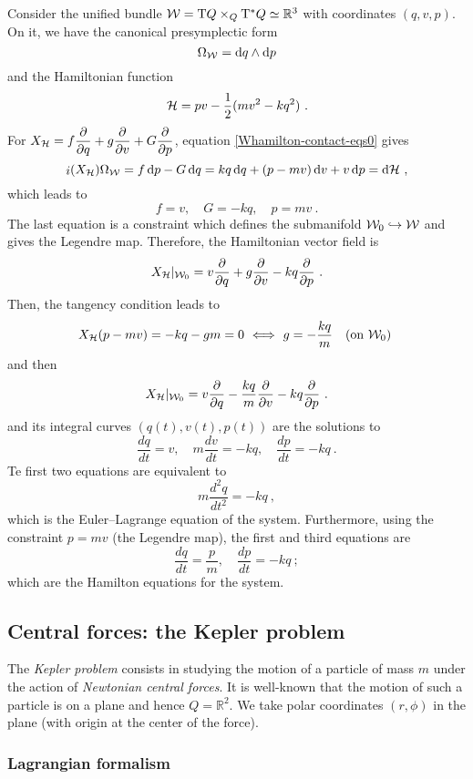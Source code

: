 \documentclass[12pt]{report}
\def\derpar#1#2{\frac{\partial{#1}}{\partial{#2}}}
\def\d{{\rm d}}
\def\Real{\mathbb{R}}
\def\Tan{{\rm T}}
\def\inn{\mathop{i}\nolimits}
\begin{document}
Consider the unified bundle ${\cal W}=\Tan Q\times_Q\Tan^*Q\simeq\Real^3$
with coordinates $(q,v,p)$. On it, we have the canonical presymplectic form
$$
\Omega_{\cal W}=\d q\wedge\d p 
$$
and the Hamiltonian function
$$
{\cal H}=pv-\frac{1}{2}(mv^2-kq^2) \ .
$$
For $\displaystyle X_{\cal H}=f\derpar{}{q}+g\derpar{}{v}+G\derpar{}{p}$,
equation \eqref{Whamilton-contact-eqs0} gives
$$
\inn(X_{\cal H})\Omega_{\cal W}= f\, \d p-G\, \d q=
kq\, \d q+(p-mv)\,\d v+v\, \d p=\d{\cal H}\ ,
$$
which leads to
$$
f=v ,\quad G=-kq ,\quad p=mv  \ .
$$
The last equation is a constraint which defines the submanifold
${\cal W}_0\hookrightarrow{\cal W}$ and gives the Legendre map.
Therefore, the Hamiltonian vector field is
$$
X_{\cal H}\vert_{{\cal W}_0}=v\derpar{}{q}+g\derpar{}{v}-kq\derpar{}{p} \ .
$$
Then, the tangency condition leads to
$$
X_{\cal H}(p-mv)=-kq-gm=0 \ \Longleftrightarrow\
g=-\frac{kq}{m} \quad \mbox{\rm (on ${\cal W}_0$)} \ 
$$
and then
$$
X_{\cal H}\vert_{{\cal W}_0}=v\derpar{}{q}-\frac{kq}{m}\derpar{}{v}-kq\derpar{}{p} \ .
$$
and its integral curves $(q(t),v(t),p(t))$ are the solutions to
$$
\frac{dq}{dt}=v ,\quad
m\frac{dv}{dt}=-kq ,\quad
\frac{dp}{dt}=-kq \ .
$$
Te first two equations are equivalent to
$$
m\frac{d^2q}{dt^2}=-kq \ ,
$$
which is the Euler--Lagrange equation of the system. 
Furthermore, using the constraint $p=mv$ (the Legendre map),
the first and third equations are
$$
\frac{dq}{dt}=\frac{p}{m} ,\quad
\frac{dp}{dt}=-kq \ ;
$$
which are the Hamilton equations for the system.


\subsection{Central forces: the Kepler problem}
\label{Kp}


The {\sl Kepler problem} consists in studying 
the motion of a particle of mass $m$
under the action of {\sl Newtonian central forces}.
It is well-known that the motion of such a particle is on a plane and hence
$Q=\Real^2$. We take polar coordinates $(r,\phi)$ in the plane
(with origin at the center of the force).


\subsubsection{Lagrangian formalism}
\end{document}
